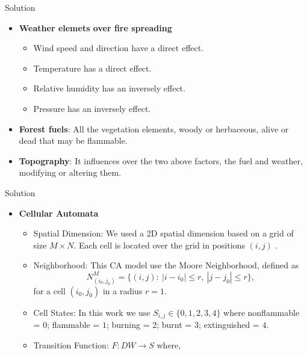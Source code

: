 \documentclass{beamer}
\begin{document}
      \begin{frame}{Solution}
        \begin{itemize}
          \item<1-> \textbf{Weather elemets over fire spreading}
            \begin{itemize}
              \item<1-> Wind speed and direction have a direct effect.
              \item<2-> Temperature has a direct effect.
              \item<3-> Relative humidity has an inversely effect.
              \item<4-> Pressure has an inversely effect.
            \end{itemize}
          \item<5-> \textbf{Forest fuels}: All the vegetation elements, woody or herbaceous, 
            alive or dead that may be flammable.
          \item<6-> \textbf{Topography}: It influences over the two above factors, the fuel and weather,
            modifying or altering them.
        \end{itemize}
      \end{frame}
      
      \begin{frame}{Solution}
        \begin{itemize}
          \item<1-> \textbf{Cellular Automata}
            \begin{itemize}
              \item<2-> Spatial Dimension: We used a 2D spatial dimension based on a grid of size $M\times N$.
                Each cell is located over the grid in positions $(i,j)$ \cite{wolfram1994cellular}.
              \item<3-> Neighborhood: This CA model use the Moore Neighborhood, defined as
                \begin{equation}
                  N_{(i_0,j_0)}^M = \{(i,j): ~ |i-i_0|\leq r, ~ |j-j_0|\leq r \},
                \end{equation}
                for a cell $(i_0, j_0)$ in a radius $r=1$.
              \item<4-> Cell States: In this work we use $S_{i,j}\in \{0, 1, 2, 3, 4\}$ where nonflammable = $0$; 
                flammable = $1$; burning = $2$; burnt = $3$; extinguished = $4$.
              \item<5-> Transition Function: $F: DW \rightarrow S$ where,
            \end{itemize}
        \end{itemize}
      \end{frame}
      
\end{document}
